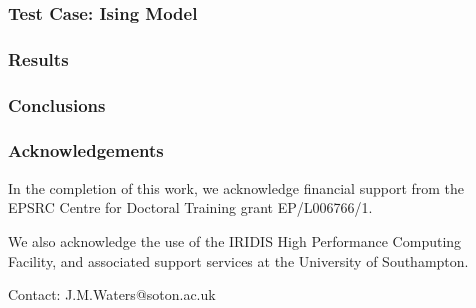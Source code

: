 \documentclass{beamer}
\begin{document}
\begin{frame}
	\frametitle{Test Case: Ising Model}
\end{frame}

\begin{frame}
	\frametitle{Results}
\end{frame}

\begin{frame}
	\frametitle{Conclusions}
\end{frame}

\begin{frame}
	\frametitle{Acknowledgements}
	In the completion of this work, we acknowledge financial support from the EPSRC Centre for Doctoral Training grant EP/L006766/1. \newline
	
	We also acknowledge the use of the IRIDIS High Performance Computing Facility, and associated support services at the University of
Southampton. \newline

	Contact: J.M.Waters@soton.ac.uk
\end{frame}
\end{document}
